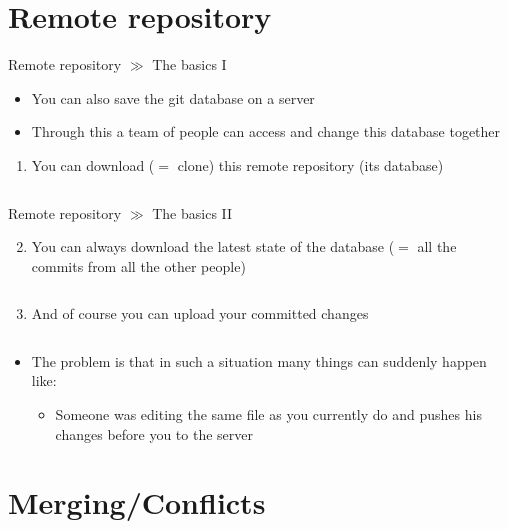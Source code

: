 \documentclass[10pt]{beamer}
\begin{document}
\section{Remote repository}

\begin{frame}{Remote repository $\gg$ The basics I}
\begin{itemize}
\item You can also save the git database on a server
\item Through this a team of people can access and change this database together
\end{itemize}
\begin{enumerate}
	\item You can download ($=$ clone) this remote repository (its database) \\
	\inputminted[bgcolor=lightGreyCustom,fontsize=\scriptsize]{sh}{./resources/git_remote_repository_01_clone.sh}
\end{enumerate}
\end{frame}

\begin{frame}{Remote repository $\gg$ The basics II}
\begin{enumerate}\setcounter{enumi}{1}
	\item You can always download the latest state of the database ($=$ all the commits from all the other people) \\
	\inputminted[bgcolor=lightGreyCustom,fontsize=\scriptsize]{sh}{./resources/git_remote_repository_02_pull.sh}
	\item And of course you can upload your committed changes \\
	\inputminted[bgcolor=lightGreyCustom,fontsize=\scriptsize]{sh}{./resources/git_remote_repository_02_push.sh}
\end{enumerate}
\begin{itemize}
	\item The problem is that in such a situation many things can suddenly happen like:
	\begin{itemize}
		\item Someone was editing the same file as you currently do and pushes his changes before you to the server
	\end{itemize}
\end{itemize}
\end{frame}

\section{Merging/Conflicts}
\end{document}
